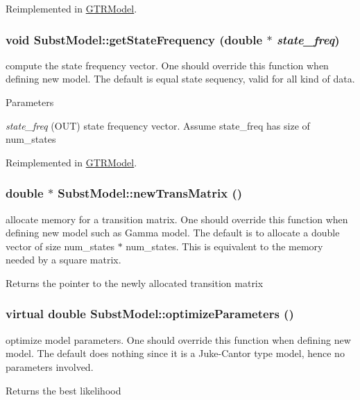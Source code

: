 Reimplemented in \hyperlink{classGTRModel_aa779b66b3824c4e956db7b56dee668c2}{GTRModel}.\hypertarget{classSubstModel_a18f98e25cacbd18e1b64b25d10a3e11f}{
\subsubsection[{getStateFrequency}]{\setlength{\rightskip}{0pt plus 5cm}void SubstModel::getStateFrequency (double $\ast$ {\em state\_\-freq})}}
\label{classSubstModel_a18f98e25cacbd18e1b64b25d10a3e11f}
compute the state frequency vector. One should override this function when defining new model. The default is equal state sequency, valid for all kind of data. 
\begin{DoxyParams}{Parameters}
\item[{\em state\_\-freq}](OUT) state frequency vector. Assume state\_\-freq has size of num\_\-states \end{DoxyParams}


Reimplemented in \hyperlink{classGTRModel_aa7cdd1fb6852faccc185284c075c918b}{GTRModel}.\hypertarget{classSubstModel_a3bea68a055833acb9dad99cb529681e5}{
\subsubsection[{newTransMatrix}]{\setlength{\rightskip}{0pt plus 5cm}double $\ast$ SubstModel::newTransMatrix ()}}
\label{classSubstModel_a3bea68a055833acb9dad99cb529681e5}
allocate memory for a transition matrix. One should override this function when defining new model such as Gamma model. The default is to allocate a double vector of size num\_\-states $\ast$ num\_\-states. This is equivalent to the memory needed by a square matrix. \begin{DoxyReturn}{Returns}
the pointer to the newly allocated transition matrix 
\end{DoxyReturn}
\hypertarget{classSubstModel_aa2d4bd724a699264b40dd5b2d129e29f}{
\subsubsection[{optimizeParameters}]{\setlength{\rightskip}{0pt plus 5cm}virtual double SubstModel::optimizeParameters ()}}
\label{classSubstModel_aa2d4bd724a699264b40dd5b2d129e29f}
optimize model parameters. One should override this function when defining new model. The default does nothing since it is a Juke-\/Cantor type model, hence no parameters involved. \begin{DoxyReturn}{Returns}
the best likelihood 
\end{DoxyReturn}


